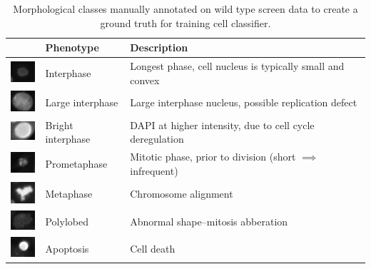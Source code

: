 \begin{table}[h!]
\begin{center}
\begin{tabular}{|l|l|p{7cm}|}
\hline
 & Phenotype & Description \\
\hline
\includegraphics[width=1cm]{img/cell_states_interphase.png} & Interphase & Longest phase, cell nucleus is typically small and convex \\
\hline
\includegraphics[width=1cm]{img/cell_states_large.png} & Large interphase & Large interphase nucleus, possible replication defect \\
\hline
\includegraphics[width=1cm]{img/cell_states_bright.png} & Bright interphase & DAPI at higher intensity, due to cell cycle deregulation \\
\hline
\includegraphics[width=1cm]{img/cell_states_prometaphase.png} & Prometaphase & Mitotic phase, prior to division (short $\implies$ infrequent) \\
\hline
\includegraphics[width=1cm]{img/cell_states_metaphase.png} & Metaphase & Chromosome alignment \\
\hline
\includegraphics[width=1cm]{img/cell_states_polylobed.png} & Polylobed & Abnormal shape--mitosis abberation \\
\hline
\includegraphics[width=1cm]{img/cell_states_apoptosis.png} & Apoptosis & Cell death \\
\hline
\end{tabular}
\caption{Morphological classes manually annotated on wild type screen data to create a ground truth for training cell classifier.}
\label{table:cell_states}
\end{center}
\end{table}

